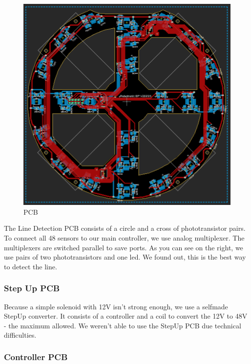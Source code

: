 \begin{figure}
    \centering
    \includegraphics[width=0.75\linewidth]{img/eagle/LineDedectionPCB.png}
    \caption{PCB}
    \label{fig:LDPCB}
\end{figure}

The Line Detection PCB consists of a circle and a cross of phototransistor pairs. To connect all
48 sensors to our main controller, we use analog multiplexer. The multiplexers are switched parallel
to save ports.
\newline
As you can see on the right, we use pairs of two phototransistors and one led. We found out, this is the 
best way to detect the line.

\subsubsection{Step Up PCB}
Because a simple solenoid with 12V isn't strong enough, we use a selfmade 
StepUp converter. It consists of a controller and a coil to convert the 12V
to 48V - the maximum allowed.
\newline
We weren't able to use the StepUp PCB due technical difficulties. 
\newline

\subsubsection{Controller PCB}

